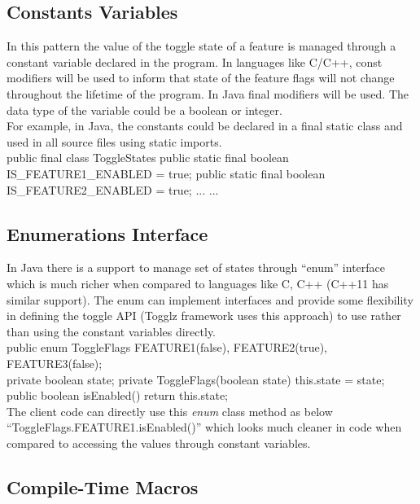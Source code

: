 \documentclass[conference]{IEEEtran}
\begin{document}
\subsection{Constants Variables}
In this pattern the value of the toggle state of a feature is managed through a constant variable declared in the program. In languages like C/C++, const modifiers will be used to inform that state of the feature flags will not change throughout the lifetime of the program. In Java final modifiers will be used. The data type of the variable could be a boolean or integer.\\

For example,  in Java, the constants could be declared in a final static class and used in all source files using static imports.\\

public final class ToggleStates {
    public static final boolean IS_FEATURE1_ENABLED = true;
    public static final boolean IS_FEATURE2_ENABLED = true;
    ... ...
}

\subsection{Enumerations Interface}
In Java there is a support to manage set of states through “enum” interface which is much richer when compared to languages like C, C++ (C++11 has similar support). The enum can implement interfaces and provide some flexibility in defining the toggle API (Togglz framework uses this approach) to use rather than using the constant variables directly.\\

public enum ToggleFlags
{
    FEATURE1(false),
    FEATURE2(true),
    FEATURE3(false);\\

    private boolean state;
    private ToggleFlags(boolean state) { this.state = state; }\\

    public boolean isEnabled() { return this.state; }
}\\

The client code can directly use this \textit{enum} class method as below ``ToggleFlags.FEATURE1.isEnabled()'' which looks much cleaner in code when compared to accessing the values through constant variables.

\subsection{Compile-Time Macros}
\end{document}
